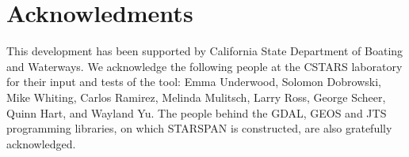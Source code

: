\documentclass{elsart}
\begin{document}
\section*{Acknowledments}

This development has been supported by California
State Department of Boating and Waterways. We acknowledge
the following people at the CSTARS laboratory for their
input and tests of the tool: Emma Underwood, Solomon
Dobrowski, Mike Whiting, Carlos Ramirez, Melinda Mulitsch,
Larry Ross, George Scheer, Quinn Hart, and Wayland Yu. The
people behind the GDAL, GEOS and JTS programming
libraries, on which STARSPAN is constructed, are also
gratefully acknowledged.



	


\end{document}
